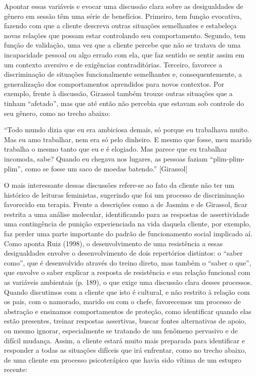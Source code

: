 Apontar essas variáveis e evocar uma discussão clara sobre as desigualdades de gênero em sessão têm uma série de benefícios. Primeiro, tem função evocativa, fazendo com que a cliente descreva outras situações semelhantes e estabeleça novas relações que possam estar controlando seu comportamento. Segundo, tem função de validação, uma vez que a cliente percebe que não se tratava de uma incapacidade pessoal ou algo errado com ela, que faz sentido se sentir assim em um contexto aversivo e de exigências contraditórias. Terceiro, favorece a discriminação de situações funcionalmente semelhantes e, consequentemente, a generalização dos comportamentos aprendidos para novos contextos. Por exemplo, frente à discussão, Girassol também trouxe outras situações que a tinham ``afetado'', mas que até então não percebia que estavam sob controle do seu gênero, como no trecho abaixo: 

``Todo mundo dizia que eu era ambiciosa demais, só porque eu trabalhava muito. Mas eu amo trabalhar, nem era só pelo dinheiro. E mesmo que fosse, meu marido trabalha o mesmo tanto que eu e é elogiado. Mas parece que eu trabalhar incomoda, sabe? Quando eu chegava nos lugares, as pessoas faziam ``plim-plim-plim'', como se fosse um saco de moedas batendo.'' [Girassol]

O mais interessante dessas discussões refere-se ao fato da cliente não ter um histórico de leituras feministas, sugerindo que foi um processo de discriminação favorecido em terapia. Frente a descrições como a de Jasmim e de Girassol, ficar restrita a uma análise molecular, identificando para as respostas de assertividade uma contingência de punição experienciada na vida daquela cliente, por exemplo, faz perder uma parte importante do padrão de funcionamento social implicado aí. Como aponta Ruiz (1998), o desenvolvimento de uma resistência a essas desigualdades envolve o desenvolvimento de dois repertórios distintos: o ``saber como'', que é desenvolvido através do treino direto, mas também o ``saber o que'', que envolve o saber explicar a resposta de resistência e sua relação funcional com as variáveis ambientais (p. 189), o que exige uma discussão clara desses processos. Quando discutimos com a cliente que isto é cultural, e não restrito à relação com os pais, com o namorado, marido ou com o chefe, favorecemos um processo de abstração e ensinamos comportamentos de proteção, como identificar quando elas estão presentes, treinar respostas assertivas, buscar fontes alternativas de apoio, ou mesmo ignorar, especialmente se tratando de um fenômeno pervasivo e de difícil mudança. Assim, a cliente estará muito mais preparada para identificar e responder a todas as situações difíceis que irá enfrentar, como no trecho abaixo, de uma cliente em processo psicoterápico que havia sido vítima de um estupro recente: 

